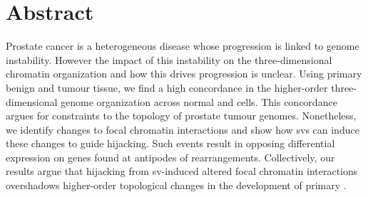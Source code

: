 \section{Abstract}

Prostate cancer is a heterogeneous disease whose progression is linked to genome instability.
However the impact of this instability on the three-dimensional chromatin organization and how this drives progression is unclear.
Using primary benign and tumour tissue, we find a high concordance in the higher-order three-dimensional genome organization across normal and  cells.
This concordance argues for constraints to the topology of prostate tumour genomes.
Nonetheless, we identify changes to focal chromatin interactions and show how \glspl{sv} can induce these changes to guide  hijacking.
Such events result in opposing differential expression on genes found at antipodes of rearrangements.
Collectively, our results argue that  hijacking from \gls{sv}-induced altered focal chromatin interactions overshadows higher-order topological changes in the development of primary .

